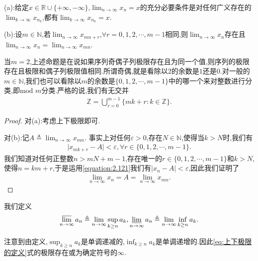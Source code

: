 \documentclass[lang=cn,newtx,10pt,scheme=chinese]{elegantbook}
\begin{document}
\begin{proposition}[子列极限命题]\label{proposition:子列极限命题}
(a):给定\(x \in \mathbb{R} \cup \{+\infty, -\infty\}\),\(\lim_{n \to \infty} x_n = x\)的充分必要条件是对任何广义存在的\(\lim_{k \to \infty} x_{n_k}\),都有\(\lim_{k \to \infty} x_{n_k} = x\).

(b):设\(m \in \mathbb{N}\),若\(\lim_{n \to \infty} x_{mn + r}\),\(\forall r = 0,1,2,\cdots,m - 1\)相同,则\(\lim_{n \to \infty} x_n\)存在且
\(\lim_{n \to \infty} x_n = \lim_{n \to \infty} x_{mn}\).
\end{proposition}
\begin{note}
当\(m = 2\),上述命题是在说如果序列奇偶子列极限存在且为同一个值,则序列的极限存在且极限和偶子列极限值相同.所谓奇偶,就是看除以\(2\)的余数是\(1\)还是\(0\).对一般的\(m \in \mathbb{N}\),我们也可以看除以\(m\)的余数是\(\{0,1,2,\cdots,m - 1\}\)中的哪一个来对整数进行分类,即\(\text{mod } m\)分类.严格的说,我们有无交并
\begin{align*}
\mathbb{Z} = \bigcup_{r = 0}^{m - 1} \{mk + r : k \in \mathbb{Z}\}.
\end{align*}
\end{note}
\begin{proof}
对(a):考虑上下极限即可.

对(b):记\(A \triangleq \lim_{n \to \infty} x_{mn}\).
事实上对任何\(\varepsilon > 0\),存在\(N \in \mathbb{N}\),使得当\(k > N\)时,我们有
\begin{align}\label{equation:2.121}
\vert x_{mk + r} - A \vert < \varepsilon, \forall r \in \{0,1,2,\cdots,m - 1\}.
\end{align}
我们知道对任何正整数\(n > mN + m - 1\),存在唯一的\(r \in \{0,1,2,\cdots,m - 1\}\)和\(k > N\),使得\(n = km + r\),于是运用\eqref{equation:2.121}我们有\(\vert x_n - A \vert < \varepsilon\),因此我们证明了
\begin{align*}
\lim_{n \to \infty} x_n = A = \lim_{n \to \infty} x_{mn} .
\end{align*}
\end{proof}

\begin{definition}[上下极限的定义]\label{theorem:上下极限的定义}
我们定义
\begin{align}\label{eq:上下极限的定义}
\varlimsup_{n \to \infty} a_n \triangleq \lim_{n \to \infty} \sup_{k \geq n} a_k, \varliminf_{n \to \infty} a_n \triangleq \lim_{n \to \infty} \inf_{k \geq n} a_k. 
\end{align}
\end{definition}
\begin{note}
注意到由定义,\(\sup_{k \geq n} a_k\)是单调递减的,\(\inf_{k \geq n} a_k\)是单调递增的.因此\eqref{eq:上下极限的定义}式的极限存在或为确定符号的\(\infty\).
\end{note}
\end{document}
